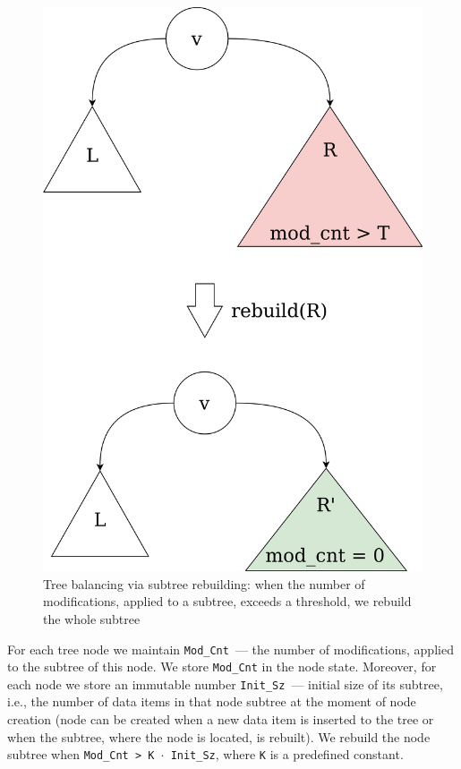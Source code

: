 \documentclass[times, dvipsnames,%
               languages={russian,english} %
              ]{itmo-student-thesis}
\begin{document}
\begin{figure}[H]
  \centering
  \caption{Tree balancing via subtree rebuilding: when the number of modifications, applied to a subtree, exceeds a threshold, we rebuild the whole subtree}
  \label{rebuild-idea-pic}
  \includegraphics[width=\linewidth]{pics/rebuild-idea.png}
\end{figure}

For each tree node we maintain \texttt{Mod\_Cnt}~--- the number of modifications, applied to the subtree of this node. We store \texttt{Mod\_Cnt} in the node state. Moreover, for each node we store an immutable number \texttt{Init\_Sz}~--- initial size of its subtree, i.e., the number of data items in that node subtree at the moment of node creation (node can be created when a new data item is inserted to the tree or when the subtree, where the node is located, is rebuilt). We rebuild the node subtree when \texttt{Mod\_Cnt > K $\cdot$ Init\_Sz}, where \texttt{K} is a predefined constant.
\end{document}
